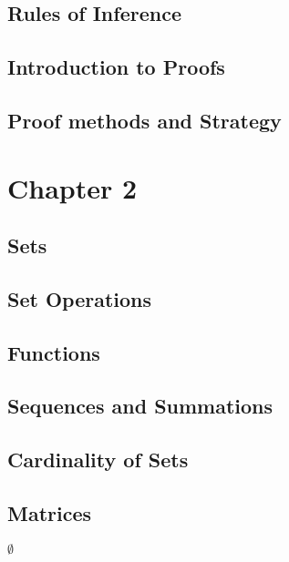\documentclass[11pt]{article}
\begin{document}
\subsection{Rules of Inference}
\label{sec-1-6}
\subsection{Introduction to Proofs}
\label{sec-1-7}
\subsection{Proof methods and Strategy}
\label{sec-1-8}
\section{Chapter 2}
\label{sec-2}
\subsection{Sets}
\label{sec-2-1}
\subsection{Set Operations}
\label{sec-2-2}
\subsection{Functions}
\label{sec-2-3}
\subsection{Sequences and Summations}
\label{sec-2-4}
\subsection{Cardinality of Sets}
\label{sec-2-5}
\subsection{Matrices}
\label{sec-2-6}




$\emptyset$
\end{document}
